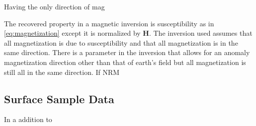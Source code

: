 	
	
	
	



Having the only direction of mag









The recovered property in a magnetic inversion is susceptibility as in \autoref{eq:magnetization} except it is normalized by $\textbf{H}$. The inversion used assumes that all magnetization is due to susceptibility and that all magnetization is in the same direction. There is a parameter in the inversion that allows for an anomaly magnetization direction other than that of earth's field but all magnetization is still all in the same direction. If \ac{NRM}






\subsection{Surface Sample Data}
\label{sec: Surface Sample Data}

In a addition to 






\endinput

Any text after an \endinput is ignored.
You could put scraps here or things in progress.
